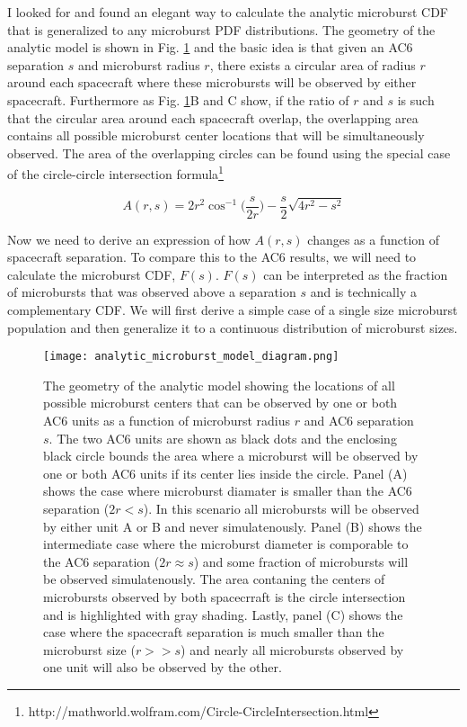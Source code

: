 \documentclass[12pt]{article}
\begin{document}
\maketitle

I looked for and found an elegant way to calculate the analytic microburst CDF that is generalized to any microburst PDF distributions. The geometry of the analytic model is shown in Fig. \ref{fig_diagram} and the basic idea is that given an AC6 separation $s$ and microburst radius $r$, there exists a circular area of radius $r$ around each spacecraft where these microbursts will be observed by either spacecraft. Furthermore as Fig. \ref{fig_diagram}B and C show, if the ratio of $r$ and $s$ is such that the circular area around each spacecraft overlap, the overlapping area contains all possible microburst center locations that will be simultaneously observed. The area of the overlapping circles can be found using the special case of the circle-circle intersection formula\footnote{http://mathworld.wolfram.com/Circle-CircleIntersection.html}

\begin{equation}
A(r, s) = 2 r^2 \cos^{-1} \Bigg( \frac{s}{2r} \Bigg)- \frac{s}{2} \sqrt{4 r^2 - s^2}
\end{equation}

Now we need to derive an expression of how $A(r, s)$ changes as a function of spacecraft separation. To compare this to the AC6 results, we will need to calculate the microburst CDF, $F(s)$. $F(s)$ can be interpreted as the fraction of microbursts that was observed above a separation $s$ and is technically a complementary CDF. We will first derive a simple case of a single size microburst population and then generalize it to a continuous distribution of microburst sizes.

\begin{figure}
\texttt{[image: analytic\_microburst\_model\_diagram.png]}
\caption{The geometry of the analytic model showing the locations of all possible microburst centers that can be observed by one or both AC6 units as a function of microburst radius $r$ and AC6 separation $s$. The two AC6 units are shown as black dots and the enclosing black circle bounds the area where a microburst will be observed by one or both AC6 units if its center lies inside the circle. Panel (A) shows the case where microburst diamater is smaller than the AC6 separation ($2r < s$). In this scenario all microbursts will be observed by either unit A or B and never simulatenously. Panel (B) shows the intermediate case where the microburst diameter is comporable to the AC6 separation ($2r \approx s$) and some fraction of microbursts will be observed simulatenously. The area contaning the centers of microbursts observed by both spacecrraft is the circle intersection and is highlighted with gray shading. Lastly, panel (C) shows the case where the spacecraft separation is much smaller than the microburst size ($r >> s$) and nearly all microbursts observed by one unit will also be observed by the other.} \label{fig_diagram}
\end{figure}
\end{document}
